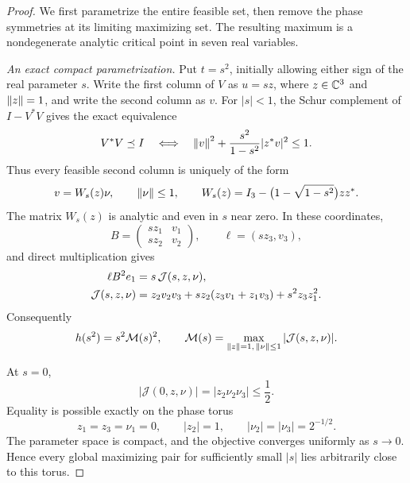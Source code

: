 \begin{proof}
We first parametrize the entire feasible set, then remove the phase
symmetries at its limiting maximizing set.  The resulting maximum is a
nondegenerate analytic critical point in seven real variables.

\emph{An exact compact parametrization.}
Put $t=s^2$, initially allowing either sign of the real parameter $s$.
Write the first column of $V$ as $u=sz$, where
$z\in\mathbb C^3$ and $\left\lVert z\right\rVert=1$, and write the second column as $v$.
For $|s|<1$, the Schur complement of $I-V^*V$ gives the exact equivalence
\begin{equation}
 V^*V\preceq I
 \quad\Longleftrightarrow\quad
 \left\lVert v\right\rVert^2+\frac{s^2}{1-s^2}|z^*v|^2\le1.
 \label{I:F:eq:f2-column-ellipsoid}
\end{equation}
Thus every feasible second column is uniquely of the form
\begin{equation}
 v=W_s(z)\nu,\qquad \left\lVert\nu\right\rVert\le1,\qquad
 W_s(z)=I_3-\bigl(1-\sqrt{1-s^2}\bigr)zz^*.
 \label{I:F:eq:f2-W-parametrization}
\end{equation}
The matrix $W_s(z)$ is analytic and even in $s$ near zero.  In these
coordinates,
\[
 B=\begin{pmatrix}sz_1&v_1\\sz_2&v_2\end{pmatrix},\qquad
 \ell=(sz_3,v_3),
\]
and direct multiplication gives
\begin{align}
 \ell B^2e_1&=s\,\mathcal J(s,z,\nu),\notag\\
 \mathcal J(s,z,\nu)
 &=z_2v_2v_3+s z_2(z_3v_1+z_1v_3)+s^2z_3z_1^2.
 \label{I:F:eq:f2-J-objective}
\end{align}
Consequently
\begin{equation}
 h(s^2)=s^2\mathcal M(s)^2,\qquad
 \mathcal M(s)=\max_{\left\lVert z\right\rVert=1,\,\left\lVert\nu\right\rVert\le1}
                  |\mathcal J(s,z,\nu)|.
 \label{I:F:eq:f2-M-definition}
\end{equation}

At $s=0$,
\[
 |\mathcal J(0,z,\nu)|=|z_2\nu_2\nu_3|\le\frac12.
\]
Equality is possible exactly on the phase torus
\begin{equation}
 z_1=z_3=\nu_1=0,\qquad
 |z_2|=1,\qquad |\nu_2|=|\nu_3|=2^{-1/2}.
 \label{I:F:eq:f2-maximizing-torus}
\end{equation}
The parameter space is compact, and the objective converges uniformly
as $s\to0$.  Hence every global maximizing pair for sufficiently small
$|s|$ lies arbitrarily close to this torus.


\end{proof}
